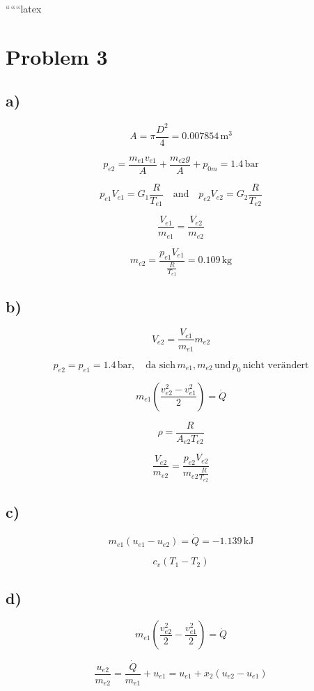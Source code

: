 
``````latex


\section*{Problem 3}

\subsection*{a)}

\[
A = \pi \frac{D^2}{4} = 0.007854 \, \text{m}^3
\]

\[
p_{e2} = \frac{m_{e1} v_{e1}}{A} + \frac{m_{e2} g}{A} + p_{0m} = 1.4 \, \text{bar}
\]

\[
p_{e1} V_{e1} = G_1 \frac{R}{T_{e1}} \quad \text{and} \quad p_{e2} V_{e2} = G_2 \frac{R}{T_{e2}}
\]

\[
\frac{V_{e1}}{m_{e1}} = \frac{V_{e2}}{m_{e2}}
\]

\[
m_{e2} = \frac{p_{e1} V_{e1}}{\frac{R}{T_{e1}}} = 0.109 \, \text{kg}
\]

\subsection*{b)}

\[
V_{e2} = \frac{V_{e1}}{m_{e1}} m_{e2}
\]

\[
p_{e2} = p_{e1} = 1.4 \, \text{bar}, \quad \text{da sich} \, m_{e1}, m_{e2} \, \text{und} \, p_0 \, \text{nicht verändert}
\]

\[
m_{e1} \left( \frac{v_{e2}^2 - v_{e1}^2}{2} \right) = \dot{Q}
\]

\[
\rho = \frac{R}{A_{e2} T_{e2}}
\]

\[
\frac{V_{e2}}{m_{e2}} = \frac{p_{e2} V_{e2}}{m_{e2} \frac{R}{T_{e2}}}
\]

\subsection*{c)}

\[
m_{e1} (u_{e1} - u_{e2}) = \dot{Q} = -1.139 \, \text{kJ}
\]

\[
c_v (T_1 - T_2)
\]

\subsection*{d)}

\[
m_{e1} \left( \frac{v_{e2}^2}{2} - \frac{v_{e1}^2}{2} \right) = \dot{Q}
\]

\[
\frac{u_{e2}}{m_{e2}} = \frac{\dot{Q}}{m_{e1}} + u_{e1} = u_{e1} + x_2 (u_{e2} - u_{e1})
\]

